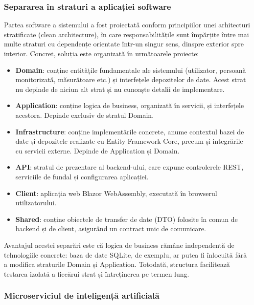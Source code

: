 \documentclass[12pt,a4paper]{article}
\begin{document}
\subsubsection{Separarea în straturi a aplicației software}

Partea software a sistemului a fost proiectată conform principiilor unei arhitecturi stratificate (clean architecture), în care responsabilitățile sunt împărțite între mai multe straturi cu dependențe orientate într-un singur sens, dinspre exterior spre interior. Concret, soluția este organizată în următoarele proiecte:

\begin{itemize}[leftmargin=1.5em]
\item \textbf{Domain}: conține entitățile fundamentale ale sistemului (utilizator, persoană monitorizată, măsurătoare etc.) și interfețele depozitelor de date. Acest strat nu depinde de niciun alt strat și nu cunoaște detalii de implementare.
\item \textbf{Application}: conține logica de business, organizată în servicii, și interfețele acestora. Depinde exclusiv de stratul Domain.
\item \textbf{Infrastructure}: conține implementările concrete, anume contextul bazei de date și depozitele realizate cu Entity Framework Core, precum și integrările cu servicii externe. Depinde de Application și Domain.
\item \textbf{API}: stratul de prezentare al backend-ului, care expune controlerele REST, serviciile de fundal și configurarea aplicației.
\item \textbf{Client}: aplicația web Blazor WebAssembly, executată în browserul utilizatorului.
\item \textbf{Shared}: conține obiectele de transfer de date (DTO) folosite în comun de backend și de client, asigurând un contract unic de comunicare.
\end{itemize}

Avantajul acestei separări este că logica de business rămâne independentă de tehnologiile concrete: baza de date SQLite, de exemplu, ar putea fi înlocuită fără a modifica straturile Domain și Application. Totodată, structura facilitează testarea izolată a fiecărui strat și întreținerea pe termen lung.

\subsubsection{Microserviciul de inteligență artificială}
\end{document}
